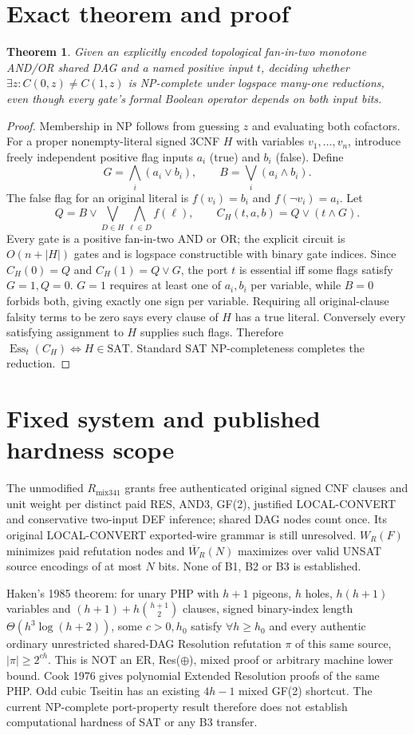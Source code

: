 \documentclass[11pt]{article}
\newtheorem{theorem}{Theorem}
\begin{document}
\section*{Exact theorem and proof}
\begin{theorem}
Given an explicitly encoded topological fan-in-two monotone AND/OR shared DAG and a named positive input $t$, deciding whether $\exists z:C(0,z)\ne C(1,z)$ is NP-complete under logspace many-one reductions, even though every gate's formal Boolean operator depends on both input bits.
\end{theorem}
\begin{proof}
Membership in NP follows from guessing $z$ and evaluating both cofactors. For a proper nonempty-literal signed 3CNF $H$ with variables $v_1,\ldots,v_n$, introduce freely independent positive flag inputs $a_i$ (true) and $b_i$ (false). Define
\[
G=\bigwedge_i(a_i\lor b_i),\qquad B=\bigvee_i(a_i\land b_i).
\]
The false flag for an original literal is $f(v_i)=b_i$ and $f(\neg v_i)=a_i$. Let
\[
Q=B\lor\bigvee_{D\in H}\bigwedge_{\ell\in D}f(\ell),\qquad
C_H(t,a,b)=Q\lor(t\land G).
\]
Every gate is a positive fan-in-two AND or OR; the explicit circuit is $O(n+|H|)$ gates and is logspace constructible with binary gate indices. Since $C_H(0)=Q$ and $C_H(1)=Q\lor G$, the port $t$ is essential iff some flags satisfy $G=1,Q=0$. $G=1$ requires at least one of $a_i,b_i$ per variable, while $B=0$ forbids both, giving exactly one sign per variable. Requiring all original-clause falsity terms to be zero says every clause of $H$ has a true literal. Conversely every satisfying assignment to $H$ supplies such flags. Therefore $\operatorname{Ess}_t(C_H)\iff H\in\mathrm{SAT}$. Standard SAT NP-completeness completes the reduction.
\end{proof}

\section*{Fixed system and published hardness scope}
The unmodified $R_{\mathrm{mix341}}$ grants free authenticated original signed CNF clauses and unit weight per distinct paid RES, AND3, GF(2), justified LOCAL-CONVERT and conservative two-input DEF inference; shared DAG nodes count once. Its original LOCAL-CONVERT exported-wire grammar is still unresolved. $W_R(F)$ minimizes paid refutation nodes and $\overline W_R(N)$ maximizes over valid UNSAT source encodings of at most $N$ bits. None of B1, B2 or B3 is established.

Haken's 1985 theorem: for unary PHP with $h+1$ pigeons, $h$ holes, $h(h+1)$ variables and $(h+1)+h\binom{h+1}{2}$ clauses, signed binary-index length $\Theta(h^3\log(h+2))$, some $c>0,h_0$ satisfy $\forall h\ge h_0$ and every authentic ordinary unrestricted shared-DAG Resolution refutation $\pi$ of this same source, $|\pi|\ge 2^{ch}$. This is NOT an ER, Res($\oplus$), mixed proof or arbitrary machine lower bound. Cook 1976 gives polynomial Extended Resolution proofs of the same PHP. Odd cubic Tseitin has an existing $4h-1$ mixed GF(2) shortcut. The current NP-complete port-property result therefore does not establish computational hardness of SAT or any B3 transfer.
\end{document}
